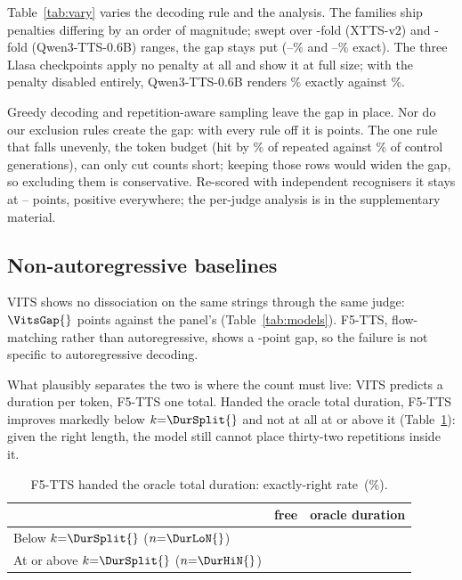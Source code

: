 \documentclass{article}
\newcommand{\tabsize}{\small}
\begin{document}
Table~\ref{tab:vary} varies the decoding rule and the analysis. The families ship penalties differing by an order of magnitude; swept
over \PenFold{}-fold (XTTS-v2) and \PenQFold{}-fold (Qwen3-TTS-0.6B)
ranges, the gap stays put (\PenRepLo{}--\PenRepHi{}\% and
\PenQRepLo{}--\PenQRepHi{}\% exact). The three Llasa checkpoints apply no
penalty at all and show it at full size; with the penalty disabled
entirely, Qwen3-TTS-0.6B renders \PenZeroRep{}\% exactly against
\PenZeroCtl{}\%.

Greedy decoding and repetition-aware sampling leave the gap in place. Nor do our exclusion rules create the gap: with every rule off it is
\ExSensAll{} points. The one rule that falls unevenly, the token budget
(hit by \ExclCapRep{}\% of repeated against \ExclCapCtl{}\% of control
generations), can
only cut counts short; keeping those rows would widen the gap, so
excluding them is conservative. Re-scored
with \IndNJudges{} independent recognisers it stays at
\IndGapLo{}--\IndGapHi{} points, positive everywhere; the per-judge
analysis is in the supplementary material.

\subsection{Non-autoregressive baselines}

VITS shows no dissociation on the same strings through the same judge:
$\VitsGap{}$ points against the panel's \ARPoolGap{}
(Table~\ref{tab:models}). F5-TTS, flow-matching rather than
autoregressive, shows a \FivettsGap{}-point
gap, so the failure is not specific to autoregressive decoding.

What plausibly separates the two is where the count must live: VITS
predicts a duration per token, F5-TTS one total. Handed the oracle total duration, F5-TTS improves markedly below
$k{=}\DurSplit{}$ and not at all at or above it (Table~\ref{tab:dur}):
given the right length, the model still cannot place thirty-two
repetitions inside it.

\begin{table}[t]
\centering
\caption{F5-TTS handed the oracle total duration: exactly-right
rate~(\%).}
\label{tab:dur}
{\tabsize\setlength{\tabcolsep}{5pt}
\begin{tabular}{lrr}
\toprule
 & free & oracle duration \\
\midrule
Below $k{=}\DurSplit{}$ ($n{=}\DurLoN{}$)      & \DurLoFree{} & \DurLoFixed{} \\
At or above $k{=}\DurSplit{}$ ($n{=}\DurHiN{}$) & \DurHiFree{} & \DurHiFixed{} \\
\bottomrule
\end{tabular}}
\end{table}
\end{document}

